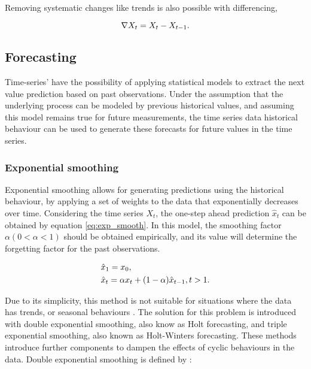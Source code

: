 Removing systematic changes like trends is also possible with differencing,

\begin {equation*}
\centering
\nabla X_t = X_t - X_{t-1}.
\end {equation*}

\subsection{Forecasting} \label{sec:forecasting}

Time-series' have the possibility of applying statistical models to extract the next value prediction based on past observations. Under the assumption that the
underlying process can be modeled by previous historical values, and assuming this model remains true for future measurements, the time series data historical 
behaviour can be used to generate these forecasts for future values in the time series. 

\subsubsection{Exponential smoothing}

\par Exponential smoothing allows for generating predictions using the historical behaviour, by applying a set of weights to the data that exponentially decreases 
over time. Considering the time series $X_t$, the one-step ahead prediction $\hat{x}_t$ can be obtained by equation \ref{eq:exp_smooth}.  In this model, the 
smoothing factor $\alpha (0 < \alpha < 1)$ should be obtained empirically, and its value will determine the forgetting factor for the past observations.

\begin {equation}
    \centering
        \begin {split}
            &\hat{x}_1 = x_0, \\
            &\hat{x}_t = \alpha x_{t} + (1-\alpha)\hat{x}_{t-1}, t > 1.
        \end {split}
    \label{eq:exp_smooth}
\end {equation}

\par Due to its simplicity, this method is not suitable for situations where the data has trends, or seasonal behaviours \cite{kalekar_time_2004}. The solution for
this problem is introduced with double exponential smoothing, also know as Holt forecasting, and triple exponential smoothing, also known as Holt-Winters
forecasting. These methods introduce further components to dampen the effects of cyclic behaviours in the data. Double exponential smoothing is defined by
\cite{munz_traffic_2010} :

